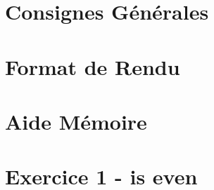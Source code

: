 \documentclass[12pt,a4paper]{article}
\begin{document}
\maketitle





\newpage

\tableofcontents

\newpage

\section{Consignes Générales}

\bigskip



\newpage

\section{Format de Rendu}
\label{sec:FormatDeRendu}

\vspace*{1cm}



\newpage

\section{Aide Mémoire}
\label{sec:AideMemoire}

\vspace*{1cm}



\newpage


%
%
%
%


\section{Exercice 1 - is even}
\end{document}
